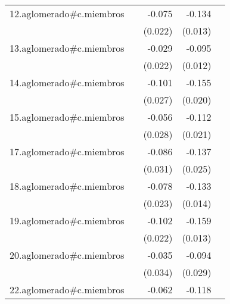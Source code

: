 {\begin{longtable}{l*{4}{D{.}{.}{-1}}}
\addlinespace
12.aglomerado#c.miembros&                     &      -0.075\sym{***}&      -0.134\sym{***}&                     \\
            &                     &     (0.022)         &     (0.013)         &                     \\
\addlinespace
13.aglomerado#c.miembros&                     &      -0.029         &      -0.095\sym{***}&                     \\
            &                     &     (0.022)         &     (0.012)         &                     \\
\addlinespace
14.aglomerado#c.miembros&                     &      -0.101\sym{***}&      -0.155\sym{***}&                     \\
            &                     &     (0.027)         &     (0.020)         &                     \\
\addlinespace
15.aglomerado#c.miembros&                     &      -0.056\sym{*}  &      -0.112\sym{***}&                     \\
            &                     &     (0.028)         &     (0.021)         &                     \\
\addlinespace
17.aglomerado#c.miembros&                     &      -0.086\sym{**} &      -0.137\sym{***}&                     \\
            &                     &     (0.031)         &     (0.025)         &                     \\
\addlinespace
18.aglomerado#c.miembros&                     &      -0.078\sym{***}&      -0.133\sym{***}&                     \\
            &                     &     (0.023)         &     (0.014)         &                     \\
\addlinespace
19.aglomerado#c.miembros&                     &      -0.102\sym{***}&      -0.159\sym{***}&                     \\
            &                     &     (0.022)         &     (0.013)         &                     \\
\addlinespace
20.aglomerado#c.miembros&                     &      -0.035         &      -0.094\sym{**} &                     \\
            &                     &     (0.034)         &     (0.029)         &                     \\
\addlinespace
22.aglomerado#c.miembros&                     &      -0.062\sym{*}  &      -0.118\sym{***}&                     \\

\end{longtable}}
